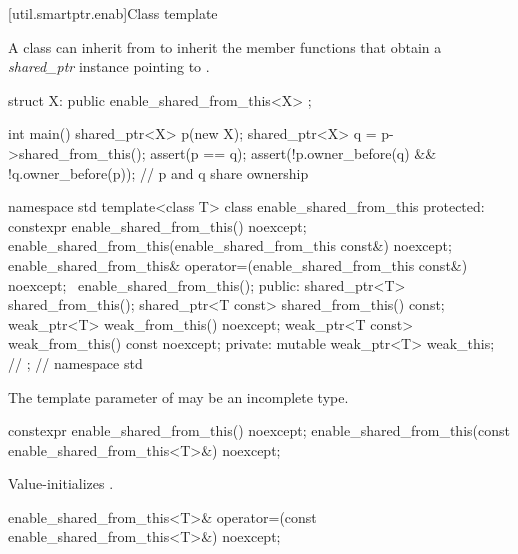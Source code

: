 [util.smartptr.enab]{Class template }

\pnum
{}%
A class  can inherit from 
to inherit the  member functions that obtain
a \textit{shared_ptr} instance pointing to .

\pnum
\begin{example}

\begin{codeblock}
struct X: public enable_shared_from_this<X> {
};

int main() {
  shared_ptr<X> p(new X);
  shared_ptr<X> q = p->shared_from_this();
  assert(p == q);
  assert(!p.owner_before(q) && !q.owner_before(p)); // p and q share ownership
}
\end{codeblock}
\end{example}

\begin{codeblock}
namespace std {
  template<class T> class enable_shared_from_this {
  protected:
    constexpr enable_shared_from_this() noexcept;
    enable_shared_from_this(enable_shared_from_this const&) noexcept;
    enable_shared_from_this& operator=(enable_shared_from_this const&) noexcept;
    ~enable_shared_from_this();
  public:
    shared_ptr<T> shared_from_this();
    shared_ptr<T const> shared_from_this() const;
    weak_ptr<T> weak_from_this() noexcept;
    weak_ptr<T const> weak_from_this() const noexcept;
  private:
    mutable weak_ptr<T> weak_this; // \expos
  };
} // namespace std
\end{codeblock}

\pnum
The template parameter  of 
may be an incomplete type.

%
\begin{itemdecl}
constexpr enable_shared_from_this() noexcept;
enable_shared_from_this(const enable_shared_from_this<T>&) noexcept;
\end{itemdecl}

\begin{itemdescr}
\pnum\effects  Value-initializes .
\end{itemdescr}

%
\begin{itemdecl}
enable_shared_from_this<T>& operator=(const enable_shared_from_this<T>&) noexcept;
\end{itemdecl}

